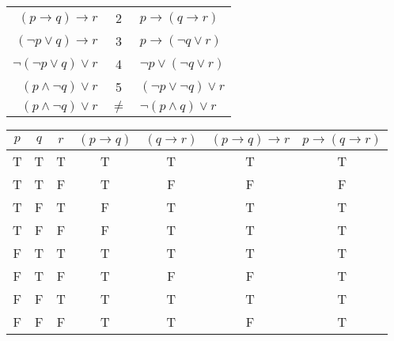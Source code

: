 \documentclass[11pt]{article}
\begin{document}
\begin{enumerate}
\begin{tabular}{ r | c | l }
      $(p\rightarrow q) \rightarrow r$ &2& $p \rightarrow (q\rightarrow r)$ \\
      $(\neg p \vee q) \rightarrow r$ &3& $p \rightarrow (\neg q \vee r)$ \\
      $\neg(\neg p \vee q) \vee r$ &4& $\neg p \vee (\neg q \vee r)$ \\
      $(p \wedge \neg q) \vee r$ &5& $(\neg p \vee \neg q) \vee r$ \\
      $(p \wedge \neg q) \vee r$ &$\ne$& $\neg (p \wedge q) \vee r$ \\
      \end{tabular}
      
      \begin{tabular}{ | c | c | c | c | c | c | c |}
        \hline
        $p$ & $q$ & $r$ & $(p \rightarrow q)$ & $(q \rightarrow r)$ & $(p\rightarrow q) \rightarrow r$ & $p \rightarrow (q\rightarrow r)$ \\ \hline
        T & T & T & T & T & T & T \\  \hline
        T & T & F & T & F & F & F \\  \hline
        T & F & T & F & T & T & T \\  \hline
        T & F & F & F & T & T & T \\  \hline
        F & T & T & T & T & T & T \\  \hline
        \rowcolor{yellow}F & T & F & T & F & F & T \\  \hline
        F & F & T & T & T & T & T \\  \hline
        \rowcolor{yellow}F & F & F & T & T & F & T \\  \hline
      \end{tabular}
      

\end{enumerate}
\end{document}
